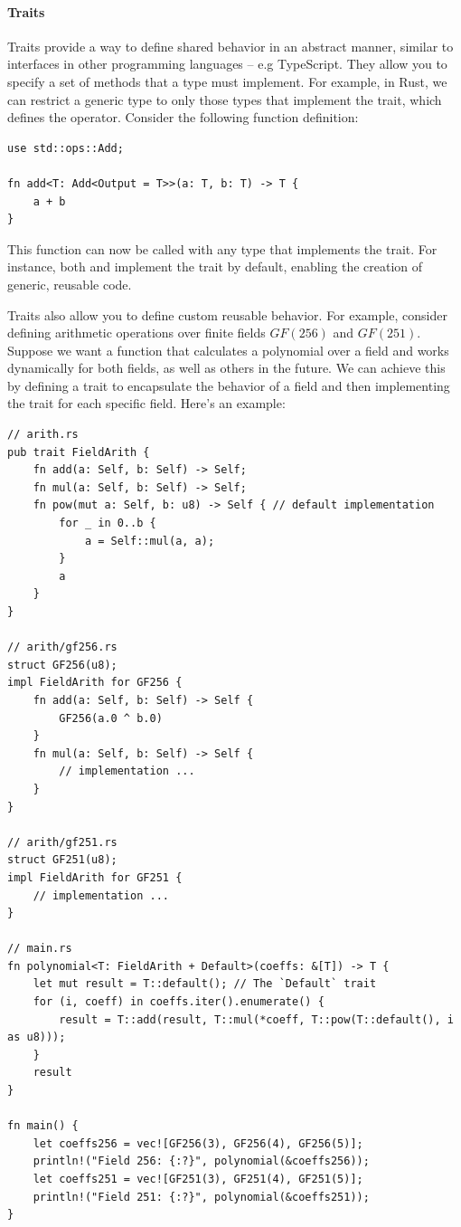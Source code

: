 \documentclass[11pt]{report}
\theoremstyle{definition}
\theoremstyle{plain}
\begin{document}
\paragraph{Traits}
Traits provide a way to define shared behavior in an abstract manner, similar to interfaces in other programming languages -- e.g TypeScript. They allow you to specify a set of methods that a type must implement. For example, in Rust, we can restrict a generic type  to only those types that implement the  trait, which defines the \rust{+} operator. Consider the following function definition:

\begin{verbatim}
use std::ops::Add;

fn add<T: Add<Output = T>>(a: T, b: T) -> T {
    a + b
}
\end{verbatim}

This function can now be called with any type that implements the  trait. For instance, both  and  implement the  trait by default, enabling the creation of generic, reusable code.

Traits also allow you to define custom reusable behavior. For example, consider defining arithmetic operations over finite fields $GF(256)$ and $GF(251)$. Suppose we want a function that calculates a polynomial over a field and works dynamically for both fields, as well as others in the future. We can achieve this by defining a trait to encapsulate the behavior of a field and then implementing the trait for each specific field. Here's an example:

\begin{verbatim}
// arith.rs
pub trait FieldArith {
    fn add(a: Self, b: Self) -> Self;
    fn mul(a: Self, b: Self) -> Self;
    fn pow(mut a: Self, b: u8) -> Self { // default implementation
        for _ in 0..b {
            a = Self::mul(a, a);
        }
        a
    }
}

// arith/gf256.rs
struct GF256(u8);
impl FieldArith for GF256 {
    fn add(a: Self, b: Self) -> Self {
        GF256(a.0 ^ b.0)
    }
    fn mul(a: Self, b: Self) -> Self {
        // implementation ...
    }
}

// arith/gf251.rs
struct GF251(u8);
impl FieldArith for GF251 {
    // implementation ...
}

// main.rs
fn polynomial<T: FieldArith + Default>(coeffs: &[T]) -> T {
    let mut result = T::default(); // The `Default` trait
    for (i, coeff) in coeffs.iter().enumerate() {
        result = T::add(result, T::mul(*coeff, T::pow(T::default(), i as u8)));
    }
    result
}

fn main() {
    let coeffs256 = vec![GF256(3), GF256(4), GF256(5)];
    println!("Field 256: {:?}", polynomial(&coeffs256));
    let coeffs251 = vec![GF251(3), GF251(4), GF251(5)];
    println!("Field 251: {:?}", polynomial(&coeffs251));
}
\end{verbatim}
\end{document}
